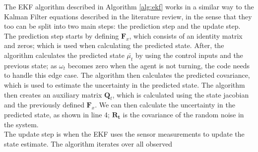 \documentclass[12pt]{article}
\begin{document}
\begin{algorithm}[H]
\end{algorithm}
The EKF algorithm described in Algorithm \ref{alg:ekf} works in a similar way to the Kalman Filter equations described in the literature
review, in the sense that they too can be split into two main steps: the prediction step and the update step. The prediction step starts
by defining \(\mathbf{F}_x\), which consists of an identity matrix and zeros; which is used when calculating the predicted state. After,
the algorithm calculates the predicted state \(\bar{\mu_t}\) by using the control inputs and the previous state; as \(\omega_t\) becomes
zero when the agent is not turning, the code needs to handle this edge case. The algorithm then calculates the predicted covariance,
which is used to estimate the uncertainty in the predicted state. The algorithm then creates an auxiliary matrix \(\mathbf{Q}_t\), which
is calculated using the state jacobian and the previously defined \(\mathbf{F}_x\). We can then calculate the uncertainty in the predicted
state, as shown in line 4; \(\mathbf{R_t}\) is the covariance of the random noise in the system.\\
The update step is when the EKF uses the sensor measurements to update the state estimate. The algorithm iterates over all observed
\end{document}
